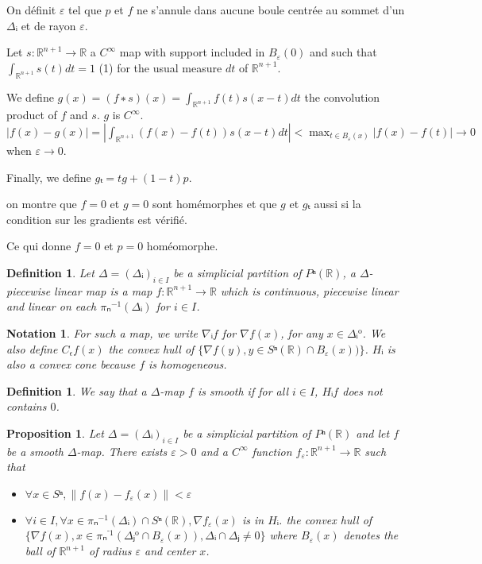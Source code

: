 \documentclass{article}
\newcommand{\interior}[1]{%
  #1^{\mathrm{o}}%
}
\newtheorem{nota}[theo]{Notation}
\newtheorem{defi}[theo]{Definition}
\newtheorem{prop}[theo]{Proposition}
\begin{document}
On définit $ε$ tel que $p$ et $f$ ne s'annule dans aucune boule centrée au
sommet d'un $Δᵢ$ et de rayon $ε$.

  Let $s:ℝ^{n+1} → ℝ$ a $C^∞$ map with support included in $B_ε(0)$ and such
  that $∫_{ℝ^{n+1}} s(t)dt = 1$ (1) for the usual measure $dt$ of $ℝ^{n+1}$.

  We define $g(x) = (f ∗ s)(x) = ∫_{ℝ^{n+1}} f(t)s(x-t) dt$ the convolution product of $f$ and
  $s$. $g$ is $C^∞$. $|f(x) - g(x)| = |∫_{ℝ^{n+1}} (f(x) - f(t))s(x-t) dt| <
  \max_{t∈B_ε(x)} |f(x) - f(t)| → 0$ when $ε → 0$.

  Finally, we define $gₜ = tg + (1 - t)p$.

  on montre que $f = 0$ et $g = 0$ sont homémorphes et
  que $g$ et $gₜ$ aussi si la condition sur les gradients est vérifié.

  Ce qui donne $f = 0$ et $p = 0$ homéomorphe.

\begin{defi}
   Let $Δ = (Δᵢ)_{i∈I}$ be  a \emph{simplicial partition} of $Pⁿ(ℝ)$, a
   \emph{$Δ$-piecewise linear map}
   is a map $f : ℝ^{n+1} → ℝ$ which is
continuous, piecewise linear and linear
  on each $πₙ^{-1}(Δᵢ)$ for $i ∈ I$.
\end{defi}

\begin{nota}
  For such a map, we write $∇ᵢf$ for $∇f(x)$, for any $x ∈
  \interior{Δᵢ}$. We also define $C_\epsilon f(x)$ the convex hull
  of $\{ ∇f(y), y∈Sⁿ(ℝ) ∩ B_ε(x))\}$. $Hᵢ$ is also a convex cone because $f$ is
  homogeneous.

\end{nota}
\begin{defi}
  We say that a $Δ$-map $f$ is smooth if for all $i ∈ I$, $Hᵢf$ does not
    contains $0$.
\end{defi}

\begin{prop}
  Let $Δ = (Δᵢ)_{i∈I}$ be  a \emph{simplicial partition} of $Pⁿ(ℝ)$ and
  let $f$ be a smooth \emph{$Δ$-map}.
  There exists $ε>0$ and a $C^∞$ function
  $f_ε : ℝ^{n+1} → ℝ$ such that
  \begin{itemize}
  \item $∀x ∈ Sⁿ, \|f(x) - f_ε(x)\| < ε$
  \item $∀i ∈ I, ∀x ∈ πₙ^{-1}(Δᵢ) ∩ Sⁿ(ℝ), ∇f_ε(x)$ is in $Hᵢ$. the convex hull of
    $\{ ∇f(x), x ∈ πₙ^{⁻1}(\interior{Δⱼ} ∩ B_ε(x)), Δᵢ ∩ Δⱼ ≠ 0\}$ where
    $B_ε(x)$ denotes the ball of $ℝ^{n+1}$ of radius $ε$ and center $x$.
  \end{itemize}
\end{prop}
\end{document}
